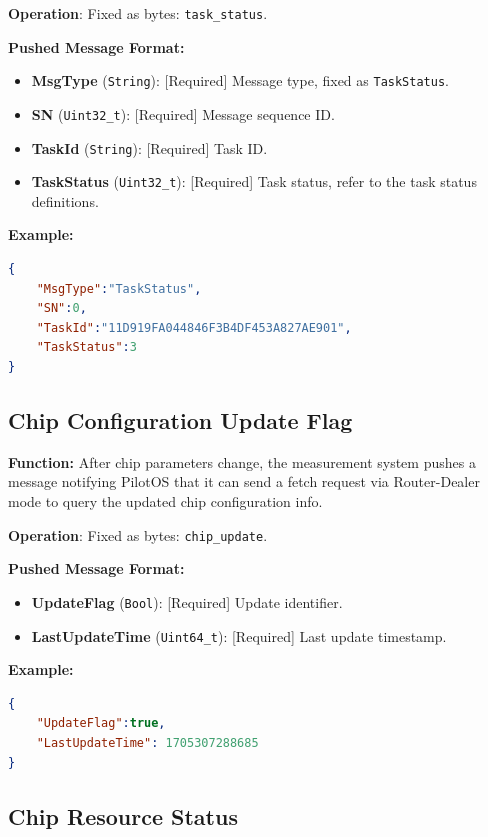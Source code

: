 \documentclass[12pt, a4paper]{article}
\begin{document}
\textbf{Operation}: Fixed as bytes: \texttt{task\_status}.

\textbf{Pushed Message Format:}
\begin{itemize}
    \item \textbf{MsgType} (\texttt{String}): [Required] Message type, fixed as \texttt{TaskStatus}.
    \item \textbf{SN} (\texttt{Uint32\_t}): [Required] Message sequence ID.
    \item \textbf{TaskId} (\texttt{String}): [Required] Task ID.
    \item \textbf{TaskStatus} (\texttt{Uint32\_t}): [Required] Task status, refer to the task status definitions.
\end{itemize}

\noindent \textbf{Example:}
\begin{lstlisting}[language=json]
{
    "MsgType":"TaskStatus",
    "SN":0,
    "TaskId":"11D919FA044846F3B4DF453A827AE901",
    "TaskStatus":3
}
\end{lstlisting}

\subsection{Chip Configuration Update Flag}

\textbf{Function:} After chip parameters change, the measurement system pushes a message notifying PilotOS that it can send a fetch request via Router-Dealer mode to query the updated chip configuration info.

\textbf{Operation}: Fixed as bytes: \texttt{chip\_update}.

\textbf{Pushed Message Format:}
\begin{itemize}
    \item \textbf{UpdateFlag} (\texttt{Bool}): [Required] Update identifier.
    \item \textbf{LastUpdateTime} (\texttt{Uint64\_t}): [Required] Last update timestamp.
\end{itemize}

\noindent \textbf{Example:}
\begin{lstlisting}[language=json]
{
    "UpdateFlag":true,
    "LastUpdateTime": 1705307288685
}
\end{lstlisting}

\subsection{Chip Resource Status}
\end{document}
